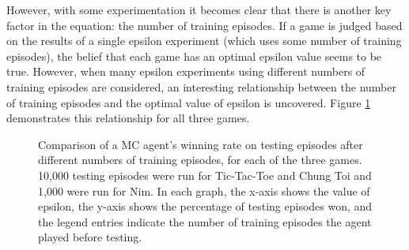 \documentclass[11pt,a4paper]{report}
\begin{document}
However, with some experimentation it becomes clear that there is another key factor in the equation: the number of training episodes. If a game is judged based on the results of a single epsilon experiment (which uses some number of training episodes), the belief that each game has an optimal epsilon value seems to be true. However, when many epsilon experiments using different numbers of training episodes are considered, an interesting relationship between the number of training episodes and the optimal value of epsilon is uncovered. Figure \ref{epsilon-win-comparisons} demonstrates this relationship for all three games.

\begin{figure}[htbp]
    \centering
    \caption{Comparison of a MC agent's winning rate on testing episodes after different numbers of training episodes, for each of the three games. 10,000 testing episodes were run for Tic-Tac-Toe and Chung Toi and 1,000 were run for Nim. In each graph, the x-axis shows the value of epsilon, the y-axis shows the percentage of testing episodes won, and the legend entries indicate the number of training episodes the agent played before testing.}
    \label{epsilon-win-comparisons}
\end{figure}
\end{document}
